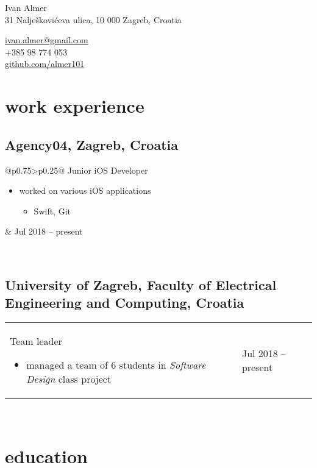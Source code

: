 \documentclass[a4paper]{article}
\makeatletter
\newlength{\tablewidth}
\newenvironment{period}[2]{%
\newcommand{\sarma}{#2}%
\setlength{\tablewidth}{\linewidth}
\addtolength{\tablewidth}{-2\tabcolsep}
\begin{tabular}{@{}p{0.75\tablewidth}>{\raggedleft\arraybackslash}p{0.25\tablewidth}@{}}%
#1 \newline
\begin{itemize}
}{%
\end{itemize} & \sarma \\%
\end{tabular}\\
}
\makeatother
\begin{document}
\fontfamily{\sfdefault}
\selectfont

\begin{minipage}{.5\textwidth}
\LARGE{Ivan Almer}\\
\normalsize{31 Nalješkovićeva ulica, 10 000 Zagreb, Croatia}
\end{minipage}%
\begin{minipage}{.5\textwidth}
\raggedleft
\href{mailto:ivan.almer@gmail.com}{ivan.almer@gmail.com} \\
+385 98 774 053 \\
\href{https://github.com/almer101}{github.com/almer101}
\end{minipage}

\vspace{1em}

\section{work experience}
\subsection{Agency04, Zagreb, Croatia}
\begin{period}{Junior iOS Developer}{Jul 2018 -- present}
    \item
        worked on various iOS applications
        \begin{itemize}
            \item Swift, Git
        \end{itemize}
\end{period}

\subsection{University of Zagreb, Faculty of Electrical Engineering and Computing, Croatia}
\begin{period}{Team leader}{Sep 2018 -- Jan 2019}
    \item managed a team of 6 students in \textit{Software Design} class project
\end{period}

\section{education}
\end{document}
